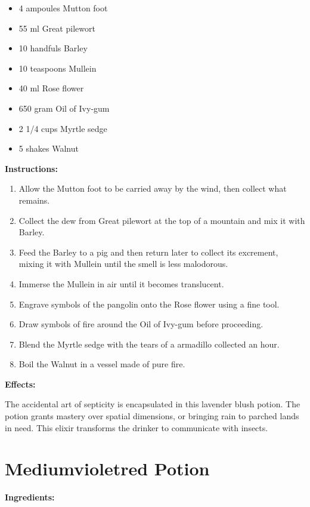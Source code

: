 \documentclass{article}
\begin{document}
\begin{itemize}
  \item 4 ampoules Mutton foot
  \item 55 ml Great pilewort
  \item 10 handfuls Barley
  \item 10 teaspoons Mullein
  \item 40 ml Rose flower
  \item 650 gram Oil of Ivy-gum
  \item 2 1/4 cups Myrtle sedge
  \item 5 shakes Walnut
\end{itemize}

\textbf{Instructions:}

\begin{enumerate}
  \item Allow the Mutton foot to be carried away by the wind, then collect what remains.
  \item Collect the dew from Great pilewort at the top of a mountain and mix it with Barley.
  \item Feed the Barley to a pig and then return later to collect its excrement, mixing it with Mullein until the smell is less malodorous.
  \item Immerse the Mullein in air until it becomes translucent.
  \item Engrave symbols of the pangolin onto the Rose flower using a fine tool.
  \item Draw symbols of fire around the Oil of Ivy-gum before proceeding.
  \item Blend the Myrtle sedge with the tears of a armadillo collected an hour.
  \item Boil the Walnut in a vessel made of pure fire.
\end{enumerate}

\textbf{Effects:}

The accidental art of septicity is encapsulated in this lavender blush potion. The potion grants mastery over spatial dimensions, or bringing rain to parched lands in need. This elixir transforms the drinker to communicate with insects.

\newpage
\section*{Mediumvioletred Potion}

\textbf{Ingredients:}
\end{document}
